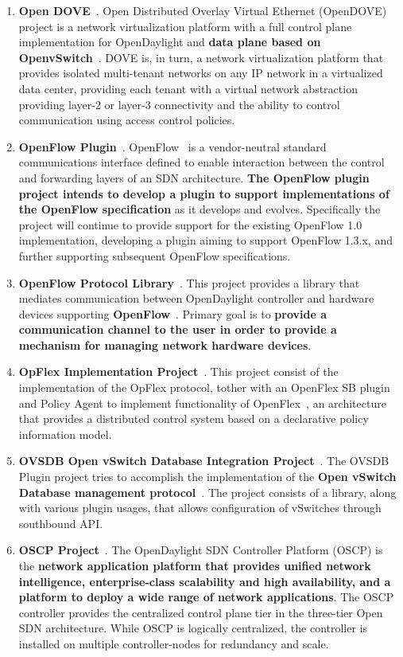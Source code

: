 \documentclass[a4paper, 12pt]{book}
\begin{document}
\begin{enumerate}
\item{\textbf{Open DOVE}}~\cite{OpenDaylightWikiOpenDove}. Open Distributed Overlay Virtual Ethernet (OpenDOVE) project is a network virtualization platform with a full control plane implementation for OpenDaylight and \textbf{data plane based on OpenvSwitch}~\cite{OVS}. DOVE is, in turn,  a network virtualization platform that provides isolated multi-tenant networks on any IP network in a virtualized data center, providing each tenant with a virtual network abstraction providing layer-2 or layer-3 connectivity and the ability to control communication using access control policies.
\item{\textbf{OpenFlow Plugin}}~\cite{OpenDaylightWikiOpenFlowPlugin}. OpenFlow~\cite{OpenFlow} is a vendor-neutral standard communications interface defined to enable interaction between the control and forwarding layers of an SDN architecture. \textbf{The OpenFlow plugin project intends to develop a plugin to support implementations of the OpenFlow specification} as it develops and evolves. Specifically the project will continue to provide support for the existing OpenFlow 1.0 implementation, developing a plugin aiming to support OpenFlow 1.3.x, and further supporting subsequent OpenFlow specifications.
\item{\textbf{OpenFlow Protocol Library}}~\cite{OpenDaylightWikiOpenFlowLib}. This project provides a library that mediates communication between OpenDaylight controller and hardware devices supporting \textbf{OpenFlow}~\cite{OpenFlow}. Primary goal is to \textbf{provide a communication channel to the user in order to provide a mechanism for managing network hardware devices}.
\item{\textbf{OpFlex Implementation Project}}~\cite{OpenDaylightWikiOpenFlowLib}. This project consist of the implementation of the OpFlex protocol, tother with an OpenFlex SB plugin and Policy Agent to implement functionality of OpenFlex~\cite{OpFlex}, an architecture that provides a distributed control system based on a declarative policy information model.
\item{\textbf{OVSDB Open vSwitch Database Integration Project}}~\cite{OpenDaylightWikiOpFlex}. The OVSDB Plugin project tries to accomplish the implementation of the \textbf{Open vSwitch Database management protocol}~\cite{OVSDB}. The project consists of a library, along with various plugin usages, that allows configuration of vSwitches through southbound API.
\item{\textbf{OSCP Project}}~\cite{OpenDaylightWikiOSCP}. The OpenDaylight SDN Controller Platform (OSCP) is the \textbf{network application platform that provides unified network intelligence, enterprise-class scalability and high availability, and a platform to deploy a wide range of network applications}. The OSCP controller provides the centralized control plane tier in the three-tier Open SDN architecture. While OSCP is logically centralized, the controller is installed on multiple controller-nodes for redundancy and scale.

\end{enumerate}
\end{document}
